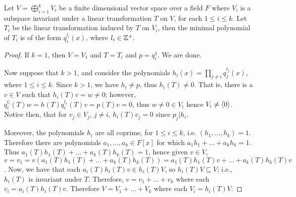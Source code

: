 \begin{theorem}\label{3.4.17}
    Let $V=\bigoplus_{i=1}^k{V_i}$ be a finite dimensional vector space over a
    field $F$ where  $V_i$ is a subspace invariant under a linear
    transformation $T$ on  $V$, for each $1 \leq i \leq k$. Let  $T_i$ be the
    linear transformation induced by  $T$ on  $V_i$, then the minimal
    polynomial of  $T_i$ is of the form  $q_i^{l_i}(x)$, where $l_i \in \mathbb{Z}^+$.
\end{theorem}
\begin{proof}
    If $k=1$, then  $V=V_1$ and $T=T_i$ and $p=q_i^1$. We are done.

    Now suppose that $k>1$, and consider the polynomials  $h_i(x)=\prod_{j \neq
    i}{q_j^{l_j}}(x)$, where $1 \leq i \leq k$. Since  $k>1$, we have $h_i \neq
    p$, thus  $h_i(T) \neq 0$. That is, there is a $v \in V$ such that
    $h_i(T)v=w \neq 0$; however, $q_i^{l_i}(T)w=h(T)q_i^{l_1}(T)v=p(T)v=0$,
    thus $w \neq 0 \in V_i$ hence  $V_i \neq \langle 0\rangle$. Notice then, that for
    $v_j \in V_j$,  $j \neq i$,  $h_i(T)v_j=0$ since $p_j|h_i$.

    Moreover, the polynomials  $h_i$ are all coprime, for  $1 \leq i \leq k$,
    i.e.  $(h_1, \dots, h_k)=1$. Therefore there are polynomials $a_1, \dots,
    a_k \in F [x]$ for which $a_1h_1+\dots+a_kh_k=1$. Thus
    $a_1(T)h_1(T)+\dots+a_k(T)h_k(T)=1$, hence given $v \in V$,  $v=v_1=v(a_1(T)h_1(T)+
    \dots+a_k(T)h_k(T))=a_1(T)h_1(T)v+\dots+a_k(T)h_k(T)v$. Now, we have that
    each $a_i(T)h_i(T)v \in h_i(T)V$, so $h_i(T)V \subseteq V$; i.e.,  $h_i(T)$
    is invariant under $T$. Therefore,  $v=v_1+\dots+v_k$ where each
    $v_i=a_i(T)h_i(T)v$. Therefore $V=V_1+\dots+V_k$ where each $V_i=h_i(T)V$.
\end{proof}

